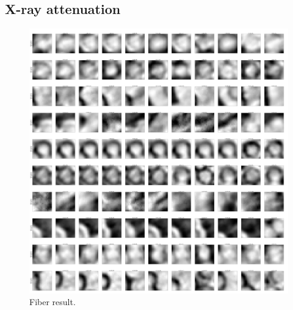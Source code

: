 \subsection{X-ray attenuation}\label{subsec:microct}

\begin{figure}[h]
\centering
\includegraphics[width=\linewidth]{img/fiberResult.png}
\caption{Fiber result.}
\label{fig:fiberResult}
\end{figure}
